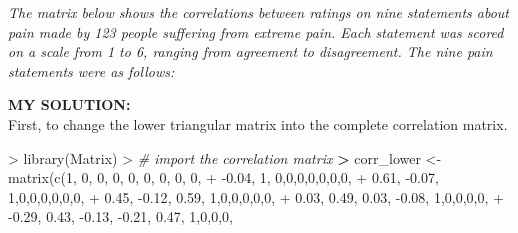 \documentclass[
]{article}
\newenvironment{Shaded}{\begin{snugshade}}{\end{snugshade}}
\newcommand{\CommentTok}[1]{\textcolor[rgb]{0.56,0.35,0.01}{\textit{#1}}}
\newcommand{\DecValTok}[1]{\textcolor[rgb]{0.00,0.00,0.81}{#1}}
\newcommand{\ErrorTok}[1]{\textcolor[rgb]{0.64,0.00,0.00}{\textbf{#1}}}
\newcommand{\FloatTok}[1]{\textcolor[rgb]{0.00,0.00,0.81}{#1}}
\newcommand{\FunctionTok}[1]{\textcolor[rgb]{0.00,0.00,0.00}{#1}}
\newcommand{\NormalTok}[1]{#1}
\newcommand{\OtherTok}[1]{\textcolor[rgb]{0.56,0.35,0.01}{#1}}
\newcommand{\SpecialCharTok}[1]{\textcolor[rgb]{0.00,0.00,0.00}{#1}}
\begin{document}
\emph{The matrix below shows the correlations between ratings on nine
statements about pain made by 123 people suffering from extreme pain.
Each statement was scored on a scale from 1 to 6, ranging from agreement
to disagreement. The nine pain statements were as follows:}

\textbf{MY SOLUTION:}\\
First, to change the lower triangular matrix into the complete
correlation matrix.

\begin{Shaded}
\begin{Highlighting}[]
\SpecialCharTok{\textgreater{}} \FunctionTok{library}\NormalTok{(Matrix)}
\SpecialCharTok{\textgreater{}} \CommentTok{\# import the correlation matrix}
\ErrorTok{\textgreater{}}\NormalTok{ corr\_lower }\OtherTok{\textless{}{-}} \FunctionTok{matrix}\NormalTok{(}\FunctionTok{c}\NormalTok{(}\DecValTok{1}\NormalTok{, }\DecValTok{0}\NormalTok{, }\DecValTok{0}\NormalTok{, }\DecValTok{0}\NormalTok{, }\DecValTok{0}\NormalTok{, }\DecValTok{0}\NormalTok{, }\DecValTok{0}\NormalTok{, }\DecValTok{0}\NormalTok{, }\DecValTok{0}\NormalTok{,}
\SpecialCharTok{+}                       \SpecialCharTok{{-}}\FloatTok{0.04}\NormalTok{, }\DecValTok{1}\NormalTok{, }\DecValTok{0}\NormalTok{,}\DecValTok{0}\NormalTok{,}\DecValTok{0}\NormalTok{,}\DecValTok{0}\NormalTok{,}\DecValTok{0}\NormalTok{,}\DecValTok{0}\NormalTok{,}\DecValTok{0}\NormalTok{,}
\SpecialCharTok{+}                       \FloatTok{0.61}\NormalTok{, }\SpecialCharTok{{-}}\FloatTok{0.07}\NormalTok{, }\DecValTok{1}\NormalTok{,}\DecValTok{0}\NormalTok{,}\DecValTok{0}\NormalTok{,}\DecValTok{0}\NormalTok{,}\DecValTok{0}\NormalTok{,}\DecValTok{0}\NormalTok{,}\DecValTok{0}\NormalTok{,}
\SpecialCharTok{+}                       \FloatTok{0.45}\NormalTok{, }\SpecialCharTok{{-}}\FloatTok{0.12}\NormalTok{, }\FloatTok{0.59}\NormalTok{, }\DecValTok{1}\NormalTok{,}\DecValTok{0}\NormalTok{,}\DecValTok{0}\NormalTok{,}\DecValTok{0}\NormalTok{,}\DecValTok{0}\NormalTok{,}\DecValTok{0}\NormalTok{,}
\SpecialCharTok{+}                       \FloatTok{0.03}\NormalTok{, }\FloatTok{0.49}\NormalTok{, }\FloatTok{0.03}\NormalTok{, }\SpecialCharTok{{-}}\FloatTok{0.08}\NormalTok{, }\DecValTok{1}\NormalTok{,}\DecValTok{0}\NormalTok{,}\DecValTok{0}\NormalTok{,}\DecValTok{0}\NormalTok{,}\DecValTok{0}\NormalTok{,}
\SpecialCharTok{+}                       \SpecialCharTok{{-}}\FloatTok{0.29}\NormalTok{, }\FloatTok{0.43}\NormalTok{, }\SpecialCharTok{{-}}\FloatTok{0.13}\NormalTok{, }\SpecialCharTok{{-}}\FloatTok{0.21}\NormalTok{, }\FloatTok{0.47}\NormalTok{, }\DecValTok{1}\NormalTok{,}\DecValTok{0}\NormalTok{,}\DecValTok{0}\NormalTok{,}\DecValTok{0}\NormalTok{,}

\end{Highlighting}
\end{Shaded}
\end{document}
